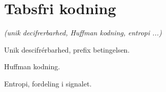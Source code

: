 \newpage
\section{Tabsfri kodning}
\textit{(unik decifrerbarhed, Huffman kodning, entropi ...)}

Unik descifrérbarhed, prefix betingelsen.

Huffman kodning.

Entropi, fordeling i signalet.
